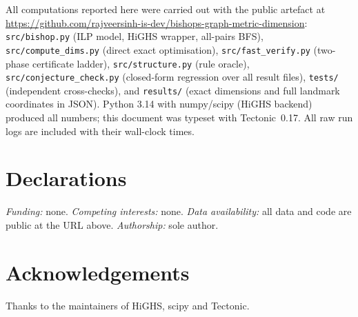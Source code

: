 \documentclass[12pt]{article}
\theoremstyle{definition}
\begin{document}
All computations reported here were carried out with the public artefact at
\url{https://github.com/rajveersinh-is-dev/bishops-graph-metric-dimension}:
\texttt{src/bishop.py} (ILP model, HiGHS wrapper, all-pairs BFS), \texttt{src/compute\_dims.py} (direct exact optimisation), \texttt{src/fast\_verify.py} (two-phase certificate ladder), \texttt{src/structure.py} (rule oracle), \texttt{src/conjecture\_check.py} (closed-form regression over all result files), \texttt{tests/} (independent cross-checks), and \texttt{results/} (exact dimensions and full landmark coordinates in JSON). Python 3.14 with numpy/scipy (HiGHS backend) produced all numbers; this document was typeset with Tectonic~0.17. All raw run logs are included with their wall-clock times.

\section*{Declarations}

\emph{Funding:} none.
\emph{Competing interests:} none.
\emph{Data availability:} all data and code are public at the URL above.
\emph{Authorship:} sole author.

\section*{Acknowledgements}
Thanks to the maintainers of HiGHS, \textsf{scipy} and \textsf{Tectonic}.



\end{document}
